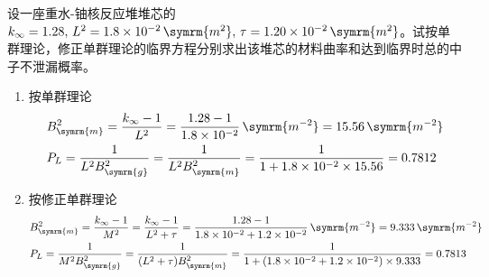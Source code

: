 \begin{exercise}
    设一座重水-铀核反应堆堆芯的$k_{\infty} = 1.28,\,L^2 = 1.8\times 10^{-2}\,\symrm{m^2},\,\tau = 1.20\times 10^{-2}\,\symrm{m^2}$。试按单群理论，修正单群理论的临界方程分别求出该堆芯的材料曲率和达到临界时总的中子不泄漏概率。
    \begin{solution}
        \begin{enumerate}[(1)]
            \item 按单群理论
            \begin{align*}
                &B_{\symrm{m}}^2 = \frac{k_{\infty} - 1}{L^2} = \frac{1.28 - 1}{1.8\times 10^{-2}}\,\symrm{m^{-2}} = 15.56\,\symrm{m^{-2}} \\
                &P_L = \frac{1}{L^2 B_{\symrm{g}}^2} = \frac{1}{L^2 B_{\symrm{m}}^2} = \frac{1}{1 + 1.8\times 10^{-2}\times 15.56} = 0.7812
            \end{align*}
            \item 按修正单群理论
            \begin{align*}
                &B_{\symrm{m}}^2 = \frac{k_{\infty} - 1}{M^2} = \frac{k_{\infty} - 1}{L^2 + \tau} = \frac{1.28 - 1}{1.8\times 10^{-2} + 1.2\times 10^{-2}}\,\symrm{m^{-2}} = 9.333\,\symrm{m^{-2}} \\
                &P_L = \frac{1}{M^2 B_{\symrm{g}}^2} = \frac{1}{(L^2 + \tau) B_{\symrm{m}}^2} = \frac{1}{1 + (1.8\times 10^{-2} + 1.2\times 10^{-2})\times 9.333} = 0.7813
            \end{align*}
        \end{enumerate}
    \end{solution}
\end{exercise}

